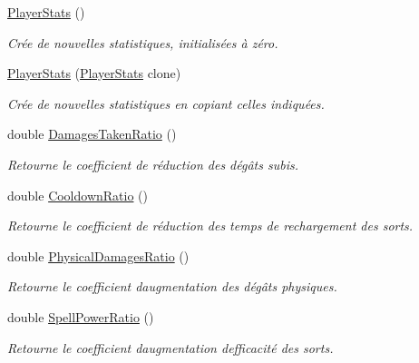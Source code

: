 \begin{DoxyCompactItemize}
\item 
\hyperlink{class_tentacle_slicers_1_1actors_1_1_player_stats_a0a2b8101d263a29f19192254bc6bce7e}{Player\+Stats} ()
\begin{DoxyCompactList}\small\item\em Crée de nouvelles statistiques, initialisées à zéro. \end{DoxyCompactList}\item 
\hyperlink{class_tentacle_slicers_1_1actors_1_1_player_stats_a5f056aab0dfb1739b8707db43d7561f9}{Player\+Stats} (\hyperlink{class_tentacle_slicers_1_1actors_1_1_player_stats}{Player\+Stats} clone)
\begin{DoxyCompactList}\small\item\em Crée de nouvelles statistiques en copiant celles indiquées. \end{DoxyCompactList}\item 
double \hyperlink{class_tentacle_slicers_1_1actors_1_1_player_stats_a210da673cb3fb0cddfe07e8a65dbfebd}{Damages\+Taken\+Ratio} ()
\begin{DoxyCompactList}\small\item\em Retourne le coefficient de réduction des dégâts subis. \end{DoxyCompactList}\item 
double \hyperlink{class_tentacle_slicers_1_1actors_1_1_player_stats_a0d7e24093042f209364aa79e18de2864}{Cooldown\+Ratio} ()
\begin{DoxyCompactList}\small\item\em Retourne le coefficient de réduction des temps de rechargement des sorts. \end{DoxyCompactList}\item 
double \hyperlink{class_tentacle_slicers_1_1actors_1_1_player_stats_a094235ee4cd7603bab14329f307daeb6}{Physical\+Damages\+Ratio} ()
\begin{DoxyCompactList}\small\item\em Retourne le coefficient d\textquotesingle{}augmentation des dégâts physiques. \end{DoxyCompactList}\item 
double \hyperlink{class_tentacle_slicers_1_1actors_1_1_player_stats_a744a660037a39b93d43eb9f27346ae09}{Spell\+Power\+Ratio} ()
\begin{DoxyCompactList}\small\item\em Retourne le coefficient d\textquotesingle{}augmentation d\textquotesingle{}efficacité des sorts. \end{DoxyCompactList}\item 

\end{DoxyCompactItemize}
